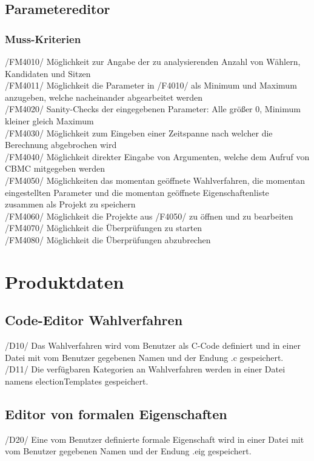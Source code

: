 \documentclass[a4paper]{scrreprt}
\begin{document}
\section{Parametereditor}
\subsection{Muss-Kriterien}
/FM4010/ Möglichkeit zur Angabe der zu analysierenden Anzahl von Wählern, Kandidaten und Sitzen \\
/FM4011/ Möglichkeit die Parameter in /F4010/ als Minimum und Maximum anzugeben, welche nacheinander abgearbeitet werden \\
/FM4020/ Sanity-Checks der eingegebenen Parameter: Alle größer 0, Minimum kleiner gleich Maximum \\
/FM4030/ Möglichkeit zum Eingeben einer Zeitspanne nach welcher die Berechnung abgebrochen wird \\
/FM4040/ Möglichkeit direkter Eingabe von Argumenten, welche dem Aufruf von CBMC mitgegeben werden \\
/FM4050/ Möglichkeiten das momentan geöffnete Wahlverfahren, die momentan eingestellten Parameter und die momentan geöffnete Eigenschaftenliste zusammen als Projekt zu speichern \\
/FM4060/ Möglichkeit die Projekte aus /F4050/ zu öffnen und zu bearbeiten \\
/FM4070/ Möglichkeit die Überprüfungen zu starten \\
/FM4080/ Möglichkeit die Überprüfungen abzubrechen \\


\chapter{Produktdaten}
\section{Code-Editor Wahlverfahren}
/D10/ Das Wahlverfahren wird vom \gls{Benutzer} als C-Code definiert und in einer Datei mit vom \gls{Benutzer} gegebenen Namen und der Endung .c gespeichert. \\
/D11/ Die verfügbaren Kategorien an Wahlverfahren werden in einer Datei namens electionTemplates gespeichert.\\

\section{Editor von formalen Eigenschaften}
/D20/ Eine vom \gls{Benutzer} definierte formale Eigenschaft wird in einer Datei mit vom \gls{Benutzer} gegebenen Namen und der Endung .eig gespeichert. \\
\end{document}
